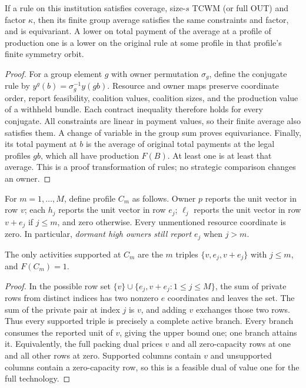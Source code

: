 \begin{lemma}\label{lem:average}
If a rule on this institution satisfies coverage, size-$s$ TCWM (or full OUT)
and factor $\kappa$, then its finite group average satisfies the same
constraints and factor, and is equivariant. A lower on total payment of the
average at a profile of production one is a lower on the original rule at
some profile in that profile's finite symmetry orbit.
\end{lemma}
\begin{proof}
For a group element $g$ with owner permutation $\sigma_g$, define the
conjugate rule by $y^g(b)=\sigma_g^{-1}y(gb)$. Resource and owner maps preserve
coordinate order, report feasibility, coalition values, coalition sizes,
and the production value of a withheld bundle. Each contract inequality
therefore holds for every conjugate. All constraints are linear in payment
values, so their finite average also satisfies them. A change of variable
in the group sum proves equivariance. Finally, its total payment at $b$ is
the average of original total payments at the legal profiles $gb$, which
all have production $F(B)$. At least one is at least that average. This is a
proof transformation of rules; no strategic comparison changes an owner.
\end{proof}

For $m=1,\ldots,M$, define profile $C_m$ as follows. Owner $p$ reports the
unit vector in row $v$; each $h_j$ reports the unit vector in row $e_j$;
$\ell_j$ reports the unit vector in row $v+e_j$ if $j\le m$, and zero
otherwise. Every unmentioned resource coordinate is zero. In particular,
\emph{dormant high owners still report $e_j$} when $j>m$.

\begin{lemma}\label{lem:star-support}
The only activities supported at $C_m$ are the $m$ triples
$\{v,e_j,v+e_j\}$ with $j\le m$, and $F(C_m)=1$.
\end{lemma}
\begin{proof}
In the possible row set
$\{v\}\cup\{e_j,v+e_j:1\le j\le M\}$, the sum of private rows from
 distinct indices has two nonzero $e$ coordinates and leaves the set. The
sum of the private pair at index $j$ is $v$, and adding $v$ exchanges those
two rows. Thus every supported triple is precisely a complete active branch.
Every branch consumes the reported unit of $v$, giving the upper bound one;
one branch attains it. Equivalently, the full packing dual prices $v$ and
all zero-capacity rows at one and all other rows at zero. Supported columns
contain $v$ and unsupported columns contain a zero-capacity row, so this is
a feasible dual of value one for the full technology.
\end{proof}

